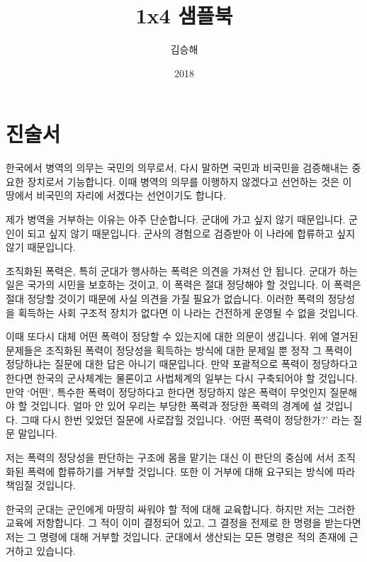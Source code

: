 \documentclass[12pt, b6paper, openany]{memoir}
\title{1x4 샘플북}
\author{김승해}
\date{2018}
\newenvironment{article}{}{}
\begin{document}
    
    \frontmatter
    \begin{titlingpage}
    \maketitle
    \end{titlingpage}
      \tableofcontents
      
    \mainmatter
    \begin{article}
    \hypertarget{uxc9c4uxc220uxc11c}{%
    \chapter{진술서}\label{uxc9c4uxc220uxc11c}}
    
    한국에서 병역의 의무는 국민의 의무로서, 다시 말하면 국민과 비국민을 검증해내는 중요한 장치로서 기능합니다. 이때 병역의 의무를 이행하지 않겠다고 선언하는 것은 이 땅에서 비국민의 자리에 서겠다는 선언이기도 합니다.
    
    제가 병역을 거부하는 이유는 아주 단순합니다. 군대에 가고 싶지 않기 때문입니다. 군인이 되고 싶지 않기 때문입니다. 군사의 경험으로 검증받아 이 나라에 합류하고 싶지 않기 때문입니다.
    
    조직화된 폭력은, 특히 군대가 행사하는 폭력은 의견을 가져선 안 됩니다. 군대가 하는 일은 국가의 시민을 보호하는 것이고, 이 폭력은 절대 정당해야 할 것입니다. 이 폭력은 절대 정당할 것이기 때문에 사실 의견을 가질 필요가 없습니다. 이러한 폭력의 정당성을 획득하는 사회 구조적 장치가 없다면 이 나라는 건전하게 운영될 수 없을 것입니다.
    
    이때 또다시 대체 어떤 폭력이 정당할 수 있는지에 대한 의문이 생깁니다. 위에 열거된 문제들은 조직화된 폭력이 정당성을 획득하는 방식에 대한 문제일 뿐 정작 그 폭력이 정당하냐는 질문에 대한 답은 아니기 때문입니다. 만약 포괄적으로 폭력이 정당하다고 한다면 한국의 군사체계는 물론이고 사법체계의 일부는 다시 구축되어야 할 것입니다. 만약 `어떤', 특수한 폭력이 정당하다고 한다면 정당하지 않은 폭력이 무엇인지 질문해야 할 것입니다. 얼마 안 있어 우리는 부당한 폭력과 정당한 폭력의 경계에 설 것입니다. 그때 다시 한번 잊었던 질문에 사로잡힐 것입니다. `어떤 폭력이 정당한가?' 라는 질문 말입니다.
    
    저는 폭력의 정당성을 판단하는 구조에 몸을 맡기는 대신 이 판단의 중심에 서서 조직화된 폭력에 합류하기를 거부할 것입니다. 또한 이 거부에 대해 요구되는 방식에 따라 책임질 것입니다.
    
    한국의 군대는 군인에게 마땅히 싸워야 할 적에 대해 교육합니다. 하지만 저는 그러한 교육에 저항합니다. 그 적이 이미 결정되어 있고, 그 결정을 전제로 한 명령을 받는다면 저는 그 명령에 대해 거부할 것입니다. 군대에서 생산되는 모든 명령은 적의 존재에 근거하고 있습니다.
    

\end{article}
\end{document}
